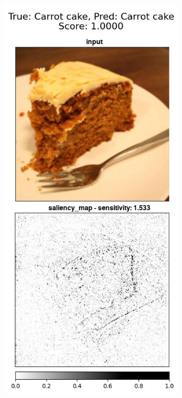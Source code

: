 \begin{figure}[ht]
  \centering
 \begin{subfigure}{.3\textwidth}
    \centering
    \includegraphics[width=\textwidth]{results/metrics/720-Carrot cake-Carrot cake_vert.jpg}

\end{subfigure}
\end{figure}
